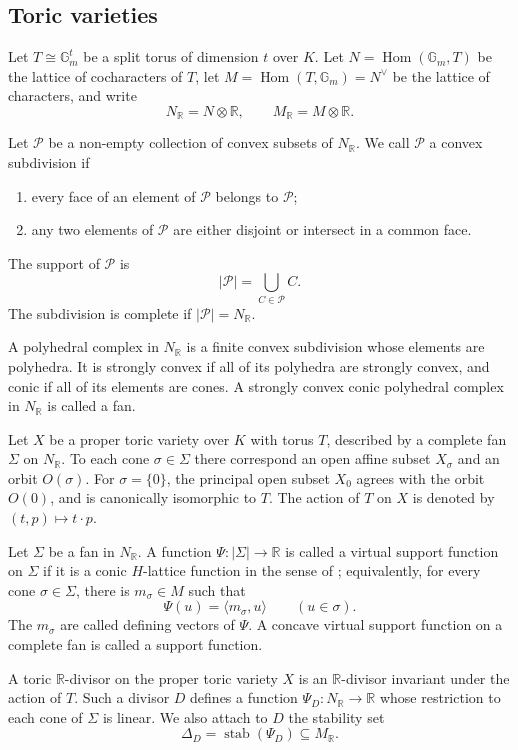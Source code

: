 \documentclass[10pt,a4paper]{amsart}
\theoremstyle{plain}
\theoremstyle{plain}
\numberwithin{equation}{section}
\begin{document}
\subsection{Toric varieties}
Let \(T\cong\mathbb G_m^t\) be a split torus of dimension \(t\) over \(K\).
Let \(N=\operatorname{Hom}(\mathbb G_m,T)\) be the lattice of cocharacters of
\(T\), let \(M=\operatorname{Hom}(T,\mathbb G_m)=N^\vee\) be the lattice of
characters, and write
\[
N_{\mathbb R}=N\otimes\mathbb R,\qquad
M_{\mathbb R}=M\otimes\mathbb R .
\]


\begin{defn}
	Let \(\mathscr P\) be a non-empty collection of convex subsets of
	\(N_{\mathbb R}\).  We call \(\mathscr P\) a convex subdivision if
	\begin{enumerate}[label=\textup{(\arabic*)},leftmargin=2em]
		\item every face of an element of \(\mathscr P\) belongs to \(\mathscr P\);
		\item any two elements of \(\mathscr P\) are either disjoint or intersect in a
		common face.
	\end{enumerate}
	The support of \(\mathscr P\) is
	\[
	|\mathscr P|=\bigcup_{C\in\mathscr P}C.
	\]
	The subdivision is complete if \(|\mathscr P|=N_{\mathbb R}\).
\end{defn}
\begin{defn}
	A polyhedral complex in \(N_{\mathbb R}\) is a finite convex subdivision
	whose elements are polyhedra.  It is strongly convex if all of its polyhedra
	are strongly convex, and conic if all of its elements are cones.  A strongly
	convex conic polyhedral complex in \(N_{\mathbb R}\) is called a fan.
\end{defn}
Let \(X\) be a proper toric variety over \(K\) with torus \(T\), described by a
complete fan \(\Sigma\) on \(N_{\mathbb R}\).  To each cone
\(\sigma\in\Sigma\) there correspond an open affine subset \(X_\sigma\) and an
orbit \(O(\sigma)\).  For \(\sigma=\{0\}\), the principal open subset \(X_0\)
agrees with the orbit \(O(0)\), and is canonically isomorphic to \(T\).  The
action of \(T\) on \(X\) is denoted by \((t,p)\mapsto t\cdot p\).
\begin{defn}
	Let \(\Sigma\) be a fan in \(N_{\mathbb R}\).  A function
	\(\Psi:|\Sigma|\to\mathbb R\) is called a virtual support function on
	\(\Sigma\) if it is a conic \(H\)-lattice function in the sense of
	\cite[Definition~2.6.6]{BPS14}; equivalently, for every cone
	\(\sigma\in\Sigma\), there is \(m_\sigma\in M\) such that
	\[
	\Psi(u)=\langle m_\sigma,u\rangle
	\qquad (u\in\sigma).
	\]
	The \(m_\sigma\) are called defining vectors of \(\Psi\).  A concave virtual
	support function on a complete fan is called a support function.
	
	A toric \(\mathbb R\)-divisor on the proper toric variety \(X\) is an
	\(\mathbb R\)-divisor invariant under the action of \(T\).  Such a divisor
	\(D\) defines a function \(\Psi_D:N_{\mathbb R}\to\mathbb R\) whose restriction
	to each cone of \(\Sigma\) is linear.  We also attach to \(D\) the stability
	set
	\[
	\Delta_D=\operatorname{stab}(\Psi_D)\subseteq M_{\mathbb R}.
	\]
\end{defn}
\end{document}
